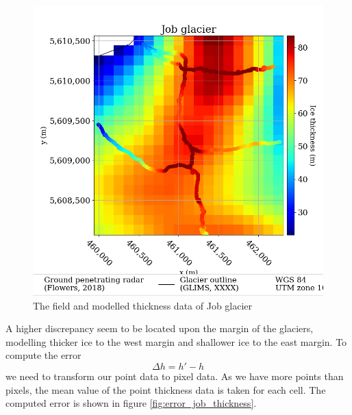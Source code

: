 \documentclass[a4, 12pt]{article}
\begin{document}
\begin{figure}[h!]
\centering
\includegraphics[scale=0.45]{../job_kluane_maps/Job glacier_cropped_thickness.png}
\caption{The field and modelled thickness data of Job glacier}
\label{fig:cropped_job_thickness}
\end{figure}
A higher discrepancy seem to be located upon the margin of the glaciers, modelling thicker ice to the west margin and shallower ice to the east margin. To compute the error \[\Delta h = h' - h\] we need to transform our point data to pixel data. As we have more points than pixels, the mean value of the point thickness data is taken for each cell. The computed error is shown in figure  \ref{fig:error_job_thickness}.
\end{document}
